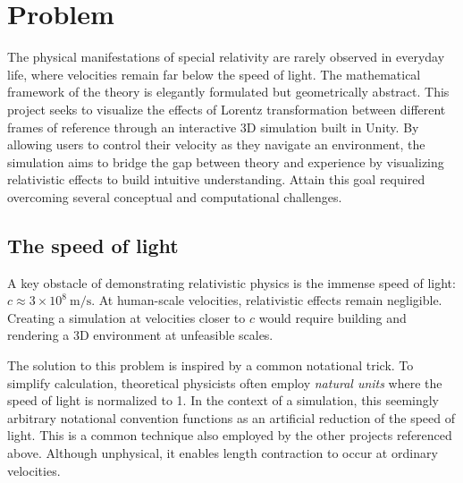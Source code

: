 \documentclass[a4paper]{article}
\begin{document}


\section{Problem} 
The physical manifestations of special relativity are rarely observed in everyday life, where velocities remain far below the speed of light. The mathematical framework of the theory is elegantly formulated but geometrically abstract. This project seeks to visualize the effects of Lorentz transformation between different frames of reference through an interactive 3D simulation built in Unity. By allowing users to control their velocity as they navigate an environment, the simulation aims to bridge the gap between theory and experience by visualizing relativistic effects to build intuitive understanding. Attain this goal required overcoming several conceptual and computational challenges.

\subsection{The speed of light}
A key obstacle of demonstrating relativistic physics is the immense speed of light: $c \approx 3 \times 10^{8} \ \text{m/s}$. At human-scale velocities, relativistic effects remain negligible. Creating a simulation at velocities closer to $c$ would require building and rendering a 3D environment at unfeasible scales.

The solution to this problem is inspired by a common notational trick. To simplify calculation, theoretical physicists often employ \textit{natural units} where the speed of light is normalized to 1. In the context of a simulation, this seemingly arbitrary notational convention functions as an artificial reduction of the speed of light. This is a common technique also employed by the other projects referenced above. Although unphysical, it enables length contraction to occur at ordinary velocities.
\end{document}
